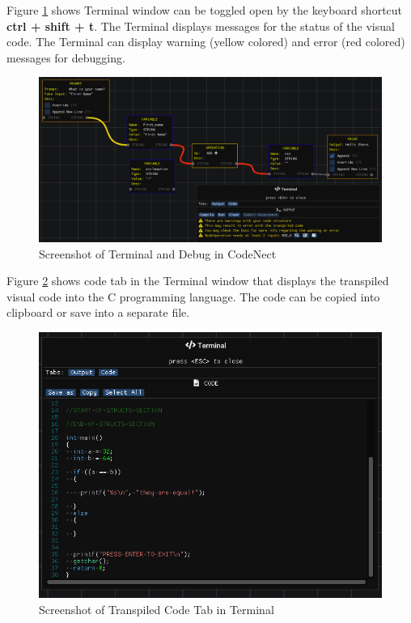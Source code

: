\parx
Figure \ref{fig:cn_debug} shows Terminal window can be toggled open by the keyboard
shortcut \textbf{ctrl + shift + t}. The Terminal displays messages for the
status of the visual code. The Terminal can display warning (yellow colored)
and error (red colored) messages for debugging.

\begin{figure}[H]
	\centering
	\captionsetup{justification=centering}
	\captionsetup[figure]{list=yes}
	\includegraphics[width=\linewidth]{media/sc_debug.png}
	\caption[Screenshot of Terminal and Debug in CodeNect]{Screenshot of Terminal and Debug in CodeNect}
	\label{fig:cn_debug}
\end{figure}

\parx
Figure \ref{fig:cn_transpiled_code} shows code tab in the Terminal window that
displays the transpiled visual code into the C programming language. The code
can be copied into clipboard or save into a separate file.

\begin{figure}[H]
	\centering
	\captionsetup{justification=centering}
	\captionsetup[figure]{list=yes}
	\includegraphics[width=\linewidth]{media/sc_transpiled_code.png}
	\caption[Screenshot of Transpiled Code Tab in Terminal]{Screenshot of Transpiled Code Tab in Terminal}
	\label{fig:cn_transpiled_code}
\end{figure}

